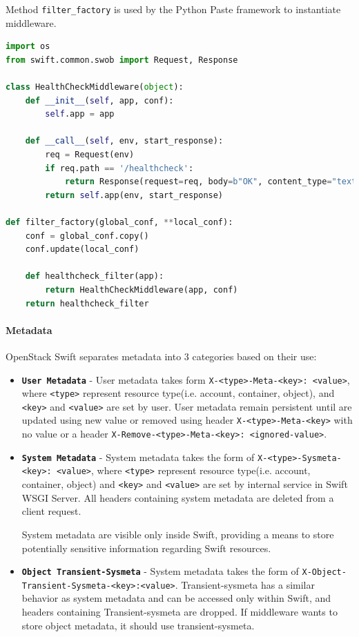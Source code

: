     Method \texttt{filter\_factory} is used by the Python Paste framework to instantiate middleware.

\begin{lstlisting}[language=Python, style=pythonStyle, caption=Example of healthcheck middleware in OpenStack Swift, label=lst:swift-healthcheck]
import os
from swift.common.swob import Request, Response

class HealthCheckMiddleware(object):
    def __init__(self, app, conf):
        self.app = app

    def __call__(self, env, start_response):
        req = Request(env)
        if req.path == '/healthcheck':
            return Response(request=req, body=b"OK", content_type="text/plain")(env, start_response)
        return self.app(env, start_response)

def filter_factory(global_conf, **local_conf):
    conf = global_conf.copy()
    conf.update(local_conf)

    def healthcheck_filter(app):
        return HealthCheckMiddleware(app, conf)
    return healthcheck_filter
\end{lstlisting}

    \paragraph{Metadata}
    OpenStack Swift separates metadata into 3 categories based on their use:
    \begin{itemize}
        \item \textbf{\texttt{User Metadata}} - User metadata takes form \texttt{X-<type>-Meta-<key>: <value>}, where \texttt{<type>} represent resource type(i.e. account, container, object), and \texttt{<key>} and \texttt{<value>} are set by user. User metadata remain persistent until are updated using new value or removed using header \texttt{X-<type>-Meta-<key>} with no value or a header \texttt{X-Remove-<type>-Meta-<key>: <ignored-value>}.
        \item \textbf{\texttt{System Metadata}} - System metadata takes the form of \texttt{X-<type>-Sysmeta-<key>: <value>}, where \texttt{<type>} represent resource type(i.e. account, container, object) and \texttt{<key>} and \texttt{<value>} are set by internal service in Swift WSGI Server.
        All headers containing system metadata are deleted from a client request.

        System metadata are visible only inside Swift, providing a means to store potentially sensitive information regarding Swift resources.
        \item \textbf{\texttt{Object Transient-Sysmeta}} - System metadata takes the form of \texttt{\newline X-Object-Transient-Sysmeta-<key>:<value>}. Transient-sysmeta has a similar behavior as system metadata and can be accessed only within Swift, and headers containing Transient-sysmeta are dropped. If middleware wants to store object metadata, it should use transient-sysmeta\cite{swiftMiddleware}.
    \end{itemize}

